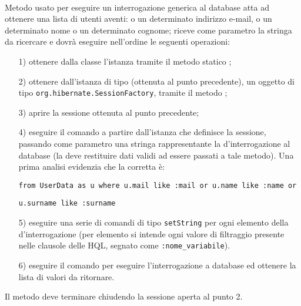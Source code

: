 \begin{description}
	
	\item{}\\
		Metodo usato per eseguire un interrogazione generica al database atta ad ottenere una lista di utenti aventi: o un determinato indirizzo e-mail, o un determinato nome o un determinato cognome; riceve come parametro la stringa da ricercare e dovrà eseguire nell'ordine le seguenti operazioni:
		\begin{itemize}
			\item[1)] ottenere dalla classe  l'istanza tramite il metodo statico ;
			\item[2)] ottenere dall'istanza di tipo (ottenuta al punto precedente), un oggetto di tipo \texttt{org.hibernate.SessionFactory}, tramite il metodo ;
			\item[3)] aprire la sessione ottenuta al punto precedente;
			\item[4)] eseguire il comando  a partire dall'istanza che definisce la sessione, passando come parametro una stringa rappresentante la  d'interrogazione al database (la  deve restituire dati validi ad essere passati a tale metodo). Una prima analisi evidenzia che la  corretta è: 
\begin{verbatim}
from UserData as u where u.mail like :mail or u.name like :name or
\end{verbatim}
\begin{verbatim}
u.surname like :surname
\end{verbatim}
			\item[5)] eseguire una serie di comandi di tipo \texttt{setString} per ogni elemento della  d'interrogazione (per elemento si intende ogni valore di filtraggio presente nelle clausole  delle  HQL, segnato come \texttt{:nome\_variabile}).
			\item[6)] eseguire il comando  per eseguire l'interrogazione a database ed ottenere la lista di valori da ritornare.
		\end{itemize}
		
Il metodo deve terminare chiudendo la sessione aperta al punto 2.

\end{description}



